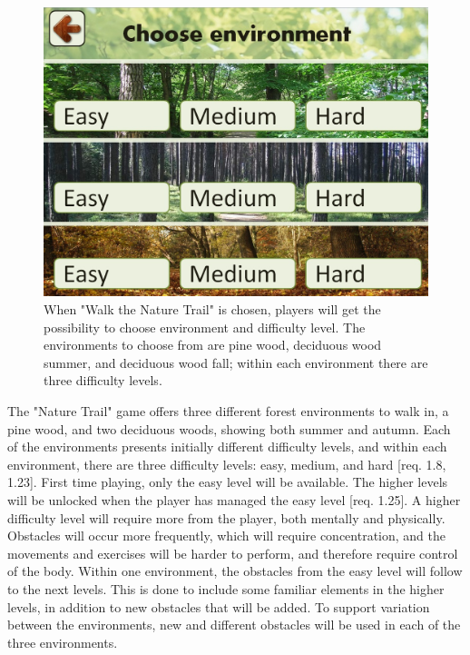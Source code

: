 \begin{figure} [H]
\centering
\includegraphics[scale=0.25]{chooseEnvironment.jpg}
\caption[Choice of environment and difficulty level]{When "Walk the Nature Trail" is chosen, players will get the possibility to choose environment and difficulty level. The environments to choose from are pine wood, deciduous wood summer, and deciduous wood fall; within each environment there are three difficulty levels.}
\label{fig:omgivelseNivaa}
\end{figure}

The "Nature Trail" game offers three different forest environments to walk in, a pine wood, and two deciduous woods, showing both summer and autumn. Each of the environments presents initially different difficulty levels, and within each environment, there are three difficulty levels: easy, medium, and hard [req. 1.8, 1.23]. First time playing, only the easy level will be available. The higher levels will be unlocked when the player has managed the easy level [req. 1.25]. A higher difficulty level will require more from the player, both mentally and physically. Obstacles will occur more frequently, which will require concentration, and the movements and exercises will be harder to perform, and therefore require control of the body. Within one environment, the obstacles from the easy level will follow to the next levels. This is done to include some familiar elements in the higher levels, in addition to new obstacles that will be added. To support variation between the environments, new and different obstacles will be used in each of the three environments.  


